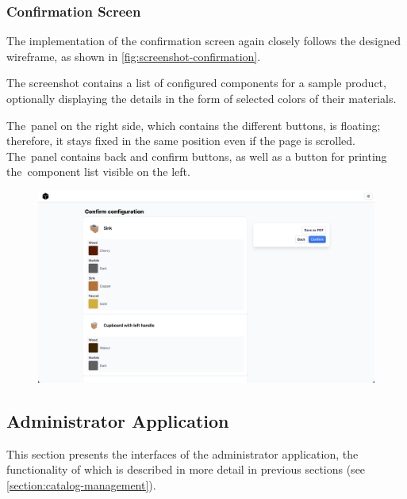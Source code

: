 \subsubsection{Confirmation Screen}

The implementation of the confirmation screen again closely follows the designed wireframe, as shown in \autoref{fig:screenshot-confirmation}.

The screenshot contains a list of configured components for a sample product, optionally displaying the details in the form of selected colors of their materials.

The~panel on the right side, which contains the different buttons, is floating; therefore, it stays fixed in the same position even if the page is scrolled. The~panel contains back and confirm buttons, as well as a button for printing the~component list visible on the left.

\begin{figure}[h]
\centering
\includegraphics[width=\textwidth]{images/screenshot_confirmation.png}
\label{fig:screenshot-confirmation}
\end{figure}


\subsection{Administrator Application}

This section presents the interfaces of the administrator application, the functionality of which is described in more detail in previous sections (see \autoref{section:catalog-management}).

